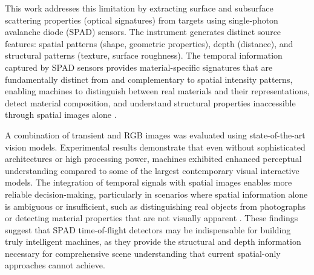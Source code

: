 \documentclass[12pt,a4paper,oneside]{report}
\begin{document}
This work addresses this limitation by extracting surface and subsurface scattering properties (optical signatures) from targets using single-photon avalanche diode (SPAD) sensors. The instrument generates distinct source features: spatial patterns (shape, geometric properties), depth (distance), and structural patterns (texture, surface roughness). The temporal information captured by SPAD sensors provides material-specific signatures that are fundamentally distinct from and complementary to spatial intensity patterns, enabling machines to distinguish between real materials and their representations, detect material composition, and understand structural properties inaccessible through spatial images alone \cite{schwartz2013,sharan2013,tafone2023}.

A combination of transient and RGB images was evaluated using state-of-the-art vision models. Experimental results demonstrate that even without sophisticated architectures or high processing power, machines exhibited enhanced perceptual understanding compared to some of the largest contemporary visual interactive models. The integration of temporal signals with spatial images enables more reliable decision-making, particularly in scenarios where spatial information alone is ambiguous or insufficient, such as distinguishing real objects from photographs or detecting material properties that are not visually apparent \cite{yang2024}. These findings suggest that SPAD time-of-flight detectors may be indispensable for building truly intelligent machines, as they provide the structural and depth information necessary for comprehensive scene understanding that current spatial-only approaches cannot achieve.
\end{document}
